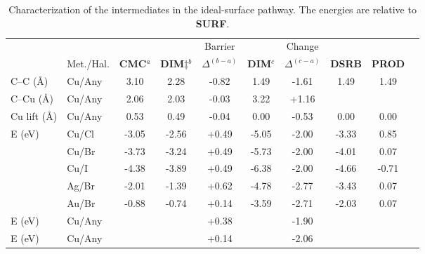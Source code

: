 \documentclass[journal=jpclcd,layout=traditional,manuscript=letter]{achemso} %
\begin{document}
\begin{table}
\centering
\scriptsize
\caption{Characterization of the intermediates in the ideal-surface pathway. %
The energies are relative to \textbf{SURF}.
}
\label{table:idealsurface}
\begin{tabular}{ llcccccccc  }
 \hline
 \hline
  & & &  & Barrier & & Change & &\\
  & Met./Hal. & \textbf{CMC}$^{a}$ & \textbf{DIM$\ddagger$}$^{b}$ & $\Delta^{(b-a)}$ &  \textbf{DIM}$^{c}$ & $\Delta^{(c-a)}$  & \textbf{DSRB} & \textbf{PROD} \\ 
 \hline 
 C--C (\si{\angstrom}) & Cu/Any & 3.10 & 2.28 & -0.82 & 1.49 & -1.61 & 1.49 & 1.49 \\ 
 \hline
 C--Cu (\si{\angstrom}) & Cu/Any & 2.06 & 2.03 & -0.03 & 3.22 & +1.16 & & \\
 \hline
 Cu lift (\si{\angstrom}) & Cu/Any & 0.53 & 0.49& -0.04  & 0.00 & -0.53 & 0.00 & 0.00 \\
 \hline
 \multirow{3}{*}{E (\si{\electronvolt}) } & Cu/Cl & -3.05 &-2.56 &+0.49 & -5.05 & -2.00& -3.33&0.85\\ 
 & Cu/Br & -3.73 & -3.24 &+0.49 & -5.73 & -2.00& -4.01&0.07\\ 
 & Cu/I  & -4.38 & -3.89 & +0.49 & -6.38 & -2.00& -4.66&-0.71\\ 
 \hline
 & Ag/Br & -2.01 & -1.39 & +0.62& -4.78 &-2.77 &-3.43 & 0.07\\ 
 \hline
 & Au/Br & -0.88 & -0.74 & +0.14& -3.59 &-2.71 &-2.03 & 0.07\\ 
 \hline
 E (\si{\electronvolt})~\cite{pccp2010} & Cu/Any &  &  & +0.38& & -1.90 & & \\
 \hline
 E (\si{\electronvolt})~\cite{jacs2013} & Cu/Any & &  & +0.14& & -2.06 & &\\
 \hline
 \hline
\end{tabular}
\end{table}
\end{document}
